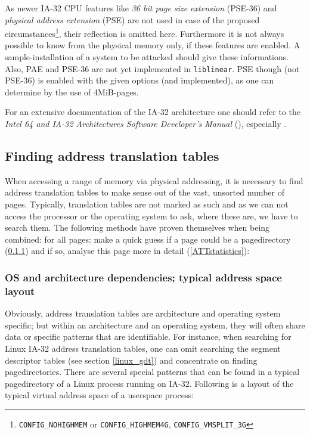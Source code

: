 As newer IA-32 CPU features like \emph{36 bit page size extension} (PSE-36) and
\emph{physical address extension} (PSE) are not used in case of the proposed
circumstances\footnote{\texttt{CONFIG\_NOHIGHMEM} or \texttt{CONFIG\_HIGHMEM4G},
\texttt{CONFIG\_VMSPLIT\_3G}}, their reflection is omitted here.  Furthermore it
is not always possible to know from the physical memory only, if these features
are enabled.  A sample-installation of a system to be attacked should give these
informations.  Also, PAE and PSE-36 are not yet implemented in
\texttt{liblinear}. PSE though (not PSE-36) is enabled with the given options
(and implemented), as one can determine by the use of 4MiB-pages.

For an extensive documentation of the IA-32 architecture one should refer to the
\emph{Intel 64 and IA-32 Architectures Software Developer's Manual}
(\cite{IA32_SDM_1:2006,IA32_SDM_2a:2006,IA32_SDM_2b:2006,IA32_SDM_3a:2006,IA32_SDM_3b:2006}),
especially \cite{IA32_SDM_3a:2006}.



\subsection{Finding address translation tables}
\label{findingATT}

When accessing a range of memory via physical addressing, it is necessary to
find address translation tables to make sense out of the vast, unsorted number
of pages. Typically, translation tables are not marked as such and as we can not
access the processor or the operating system to ask, where these are, we have to
search them. The following methods have proven themselves when being combined:
for all pages: make a quick guess if a page could be a pagedirectory
(\ref{ATTguess}) and if so, analyse this page more in detail
(\ref{ATTstatistics}):



\subsubsection{OS and architecture dependencies; typical address space layout}

\label{ATTguess} Obviously, address translation tables are architecture and
operating system specific; but within an architecture and an operating system,
they will often share data or specific patterns that are identifiable. For
instance, when searching for Linux IA-32 address translation tables, one can
omit searching the segment descriptor tables (see section \ref{linux_gdt}) and
concentrate on finding pagedirectories. There are several special patterns that
can be found in a typical pagedirectory of a Linux process running on IA-32.
Following is a layout of the typical virtual address space of a userspace
process:

